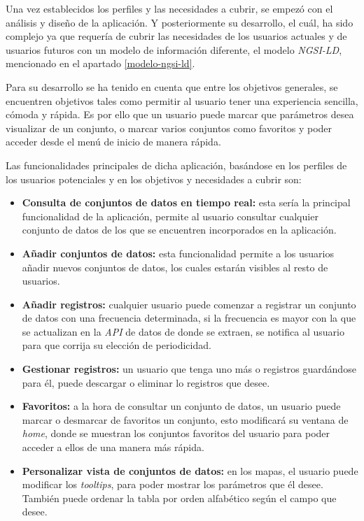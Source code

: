 Una vez establecidos los perfiles y las necesidades a cubrir, se empezó con el análisis y diseño de la aplicación. Y posteriormente su desarrollo, el cuál, ha sido complejo ya que requería de cubrir las necesidades de los usuarios actuales y de usuarios futuros con un modelo de información diferente, el modelo \textit{NGSI-LD}, mencionado en el apartado \ref{modelo-ngsi-ld}.

Para su desarrollo se ha tenido en cuenta que entre los objetivos generales, se encuentren objetivos tales como permitir al usuario tener una experiencia sencilla, cómoda y rápida. Es por ello que un usuario puede marcar que parámetros desea visualizar de un conjunto, o marcar varios conjuntos como favoritos y poder acceder desde el menú de inicio de manera rápida.

Las funcionalidades principales de dicha aplicación, basándose en los perfiles de los usuarios potenciales y en los objetivos y necesidades a cubrir son:

\begin{itemize}
    \item \textbf{Consulta de conjuntos de datos en tiempo real:} esta sería la principal funcionalidad de la aplicación, permite al usuario consultar cualquier conjunto de datos de los que se encuentren incorporados en la aplicación.  
    \item \textbf{Añadir conjuntos de datos:} esta funcionalidad permite a los usuarios añadir nuevos conjuntos de datos, los cuales estarán visibles al resto de usuarios.
    \item \textbf{Añadir registros:} cualquier usuario puede comenzar a registrar un conjunto de datos con una frecuencia determinada, si la frecuencia es mayor con la que se actualizan en la \textit{API} de datos de donde se extraen, se notifica al usuario para que corrija su elección de periodicidad.
    \item \textbf{Gestionar registros:} un usuario que tenga uno más o registros guardándose para él, puede descargar o eliminar lo registros que desee.
    \item \textbf{Favoritos:} a la hora de consultar un conjunto de datos, un usuario puede marcar o desmarcar de favoritos un conjunto, esto modificará su ventana de \textit{home}, donde se muestran los conjuntos favoritos del usuario para poder acceder a ellos de una manera más rápida.
    \item \textbf{Personalizar vista de conjuntos de datos:} en los mapas, el usuario puede modificar los \textit{tooltips}, para poder mostrar los parámetros que él desee. También puede ordenar la tabla por orden alfabético según el campo que desee.
\end{itemize}

